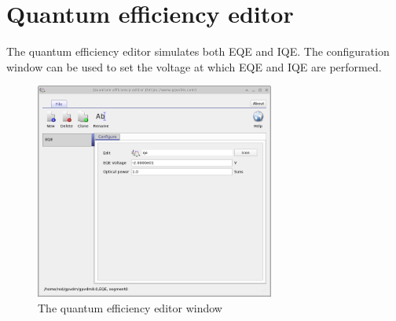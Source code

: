 \section{Quantum efficiency editor}
The quantum efficiency editor simulates both EQE and IQE.  The configuration window can be used to set the voltage at which EQE and IQE are performed.
\begin{figure}[H]
\centering
\includegraphics[width=0.7\textwidth,height=0.5\textwidth]{./images/qe_editor.png}
\caption{The quantum efficiency editor window}
\label{fig:qeeditor}
\end{figure}


